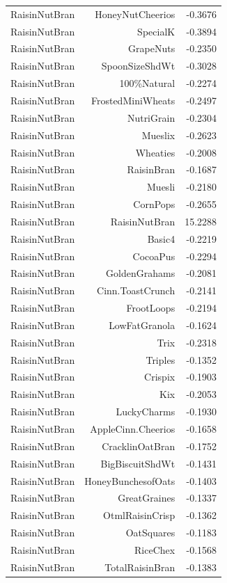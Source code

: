 \begin{longtable}{@{}lrr@{}}
RaisinNutBran & HoneyNutCheerios & -0.3676 \\
RaisinNutBran & SpecialK & -0.3894 \\
RaisinNutBran & GrapeNuts & -0.2350 \\
RaisinNutBran & SpoonSizeShdWt & -0.3028 \\
RaisinNutBran & 100\%Natural & -0.2274 \\
RaisinNutBran & FrostedMiniWheats & -0.2497 \\
RaisinNutBran & NutriGrain & -0.2304 \\
RaisinNutBran & Mueslix & -0.2623 \\
RaisinNutBran & Wheaties & -0.2008 \\
RaisinNutBran & RaisinBran & -0.1687 \\
RaisinNutBran & Muesli & -0.2180 \\
RaisinNutBran & CornPops & -0.2655 \\
RaisinNutBran & RaisinNutBran & 15.2288 \\
RaisinNutBran & Basic4 & -0.2219 \\
RaisinNutBran & CocoaPus & -0.2294 \\
RaisinNutBran & GoldenGrahams & -0.2081 \\
RaisinNutBran & Cinn.ToastCrunch & -0.2141 \\
RaisinNutBran & FrootLoops & -0.2194 \\
RaisinNutBran & LowFatGranola & -0.1624 \\
RaisinNutBran & Trix & -0.2318 \\
RaisinNutBran & Triples & -0.1352 \\
RaisinNutBran & Crispix & -0.1903 \\
RaisinNutBran & Kix & -0.2053 \\
RaisinNutBran & LuckyCharms & -0.1930 \\
RaisinNutBran & AppleCinn.Cheerios & -0.1658 \\
RaisinNutBran & CracklinOatBran & -0.1752 \\
RaisinNutBran & BigBiscuitShdWt & -0.1431 \\
RaisinNutBran & HoneyBunchesofOats & -0.1403 \\
RaisinNutBran & GreatGraines & -0.1337 \\
RaisinNutBran & OtmlRaisinCrisp & -0.1362 \\
RaisinNutBran & OatSquares & -0.1183 \\
RaisinNutBran & RiceChex & -0.1568 \\
RaisinNutBran & TotalRaisinBran & -0.1383 \\

\end{longtable}
